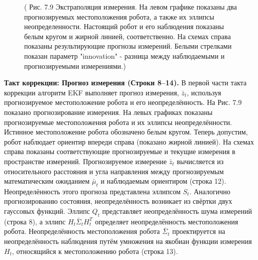 \documentclass[10pt,a4paper]{article}
\begin{document}
\begin{figure}[H]
	\caption{ (  Рис. 7.9 Экстраполяция измерения. На левом графике показаны два прогнозируемых местоположения робота, а также их эллипсы неопределенности. Настоящий робот и его наблюдения показаны белым кругом и жирной линией, соответственно. На схемах справа показаны результирующие прогнозы измерений. Белыми стрелками показан параметр "innovation" - разница между наблюдаемыми и прогнозируемыми измерениями.)}
	\label{fig:79orig}
\end{figure}

\textbf{Такт коррекции: Прогноз измерения (Строки 8–14).} В первой части такта коррекции алгоритм EKF выполняет прогноз измерения, $\bar{z}_t$, используя прогнозируемое местоположение робота и его неопределённость. На Рис. 7.9 показано прогнозирование измерения. На левых графиках показаны прогнозируемые местоположения робота и их эллипсы неопределённости. Истинное местоположение робота обозначено белым кругом. Теперь допустим, робот наблюдает ориентир впереди справа (показано жирной линией). На схемах справа показаны соответствующие прогнозируемые и текущие измерения в пространстве измерений. Прогнозируемое измерение $\bar{z}_t$ вычисляется из относительного расстояния и угла направления между прогнозируемым математическим ожиданием $\bar{\mu}_t$ и наблюдаемым ориентиром (строка 12).
Неопределённость этого прогноза представлена эллипсом $S_t$. Аналогично прогнозированию состояния, неопределённость возникает из свёртки двух гауссовых функций. Эллипс $Q_t$ представляет неопределённость шума измерений (строка 8), а эллипс $H_t\bar{\varSigma}_tH_t^T$ определяет неопределённость местоположения робота. Неопределённость местоположения робота $\bar{\varSigma}_t$ проектируется на неопределённость наблюдения путём умножения на якобиан функции измерения $H_t$, относящийся к местоположению робота (строка 13). 
\end{document}
